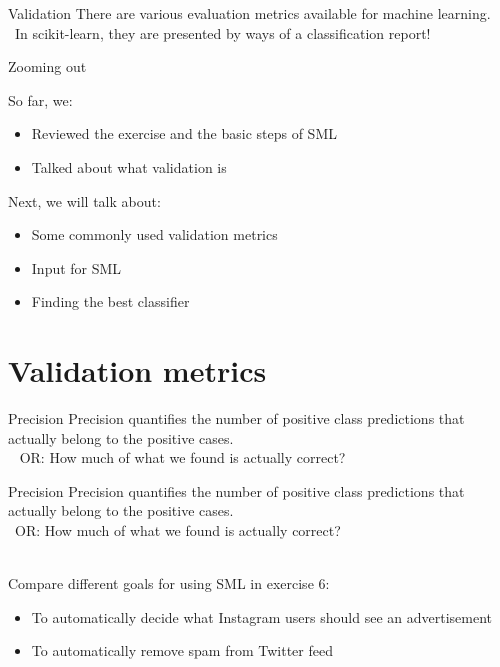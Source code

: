 \documentclass[compress]{beamer}
\begin{document}
\begin{frame}[fragile]{Validation}
There are various evaluation metrics available for machine learning. \\\
In scikit-learn, they are presented by ways of a classification report!
\end{frame}


\begin{frame}[fragile]{Zooming out} 
	
\begin{alertblock}{So far, we:}
\begin{itemize}
	\item Reviewed the exercise and the basic steps of SML
	\item Talked about what validation is
\end{itemize}
\end{alertblock}
	
\begin{alertblock}{Next, we will talk about:}
\begin{itemize}
	\item Some commonly used validation metrics
	\item Input for SML
	\item Finding the best classifier
\end{itemize}
\end{alertblock}	
\end{frame}

\section{Validation metrics}

\begin{frame}[fragile]{Precision}
Precision quantifies the number of positive class predictions that actually belong to the positive cases. \\\ 
\pause
OR: How much of what we found is actually correct?
\end{frame}

\begin{frame}{Precision}
Precision quantifies the number of positive class predictions that actually belong to the positive cases. \\\ 
OR: How much of what we found is actually correct? \\\


\begin{alertblock}{Compare different goals for using SML in exercise 6:}
\begin{itemize}
	\item To automatically decide what Instagram users should see an advertisement
	\item To automatically remove spam from Twitter feed
\end{itemize}
\end{alertblock}
\end{frame}
\end{document}
